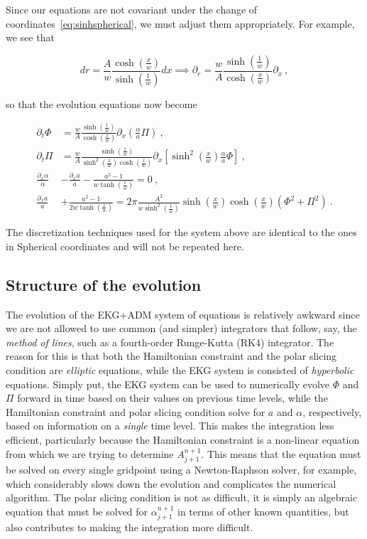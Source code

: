 \documentclass[a4paper,11pt]{article}
\renewcommand{\a}{\alpha}
\newcommand{\pd}{\partial}
\newcommand{\lrpar}[1]{\left( #1 \right)}
\newcommand{\lrsquare}[1]{\left[ #1 \right]}
\newcommand{\n}{\noindent}
\newcommand{\eq}[1]{
  \begin{equation}
    #1
  \end{equation}
}
\newcommand{\al}[1]{
  \begin{align}
    #1
  \end{align}
}
\begin{document}
Since our equations are not covariant under the change of coordinates~\eqref{eq:sinhspherical}, we must adjust them appropriately. For example, we see that

\eq{ dr = \frac{A}{w}\frac{\cosh\!\lrpar{\frac{x}{w}}}{\sinh\!\lrpar{\frac{1}{w}}}dx \implies \pd_{r} = \frac{w}{A}\frac{\sinh\!\lrpar{\frac{1}{w}}}{\cosh\!\lrpar{\frac{x}{w}}} \pd_{x}\ ,}

\n so that the evolution equations now become

\al{
  \pd_{t}\Phi &= \frac{w}{A}\frac{\sinh\!\lrpar{\frac{1}{w}}}{\cosh\!\lrpar{\frac{x}{w}}} \pd_{x}\lrpar{\frac{\a}{a}\Pi}\ ,\\
  \pd_{t}\Pi  &= \frac{w}{A}\frac{\sinh\!\lrpar{\frac{1}{w}}}{\sinh^{2}\!\lrpar{\frac{x}{w}}\cosh\!\lrpar{\frac{x}{w}}} \pd_{x}\lrsquare{\sinh^{2}\!\lrpar{\frac{x}{w}}\frac{\a}{a}\Phi}\ ,\\
  \frac{\pd_{x}\a}{\a} &- \frac{\pd_{x} a}{a} - \frac{a^{2}-1}{w\tanh\!\lrpar{\frac{x}{w}}} = 0\ ,\\
  \frac{\pd_{x} a}{a} &+ \frac{a^{2}-1}{2w\tanh\!\lrpar{\frac{x}{w}}} = 2\pi\frac{A^{2}}{w\sinh^{2}\!\lrpar{\frac{1}{w}}}\sinh\!\lrpar{\frac{x}{w}}\cosh\!\lrpar{\frac{x}{w}}\lrpar{\Phi^{2} + \Pi^{2}}\ .
}

\n The discretization techniques used for the system above are identical to the ones in Spherical coordinates and will not be repeated here.

\subsection{Structure of the evolution}

The evolution of the EKG+ADM system of equations is relatively awkward since we are not allowed to use common (and simpler) integrators that follow, say, the \emph{method of lines}, such as a fourth-order Runge-Kutta (RK4) integrator. The reason for this is that both the Hamiltonian constraint and the polar slicing condition are \emph{elliptic} equations, while the EKG system is consisted of \emph{hyperbolic} equations. Simply put, the EKG system can be used to numerically evolve $\Phi$ and $\Pi$ forward in time based on their values on previous time levels, while the Hamiltonian constraint and polar slicing condition solve for $a$ and $\a$, respectively, based on information on a \emph{single} time level. This makes the integration less efficient, particularly because the Hamiltonian constraint is a non-linear equation from which we are trying to determine $A^{n+1}_{j+1}$. This means that the equation must be solved on every single gridpoint using a Newton-Raphson solver, for example, which considerably slows down the evolution and complicates the numerical algorithm. The polar slicing condition is not as difficult, it is simply an algebraic equation that must be solved for $\a^{n+1}_{j+1}$ in terms of other known quantities, but also contributes to making the integration more difficult.
\end{document}
